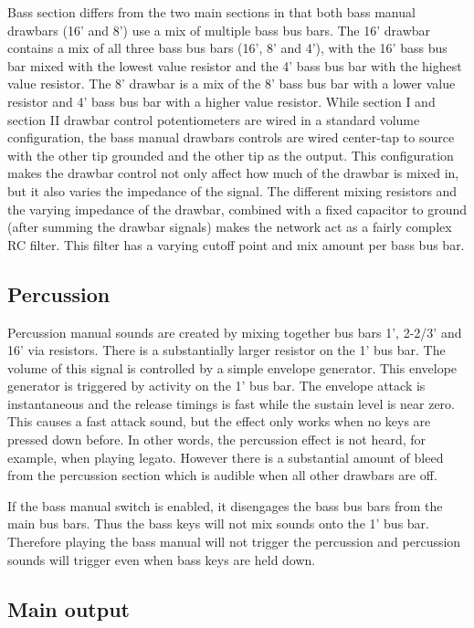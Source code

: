 \documentclass[11pt,a4paper]{article}
\begin{document}
Bass section differs from the two main sections in that both bass manual drawbars (16' and 8') use a mix of multiple bass bus bars. The 16' drawbar contains a mix of all three bass bus bars (16', 8' and 4'), with the 16' bass bus bar mixed with the lowest value resistor and the 4' bass bus bar with the highest value resistor. The 8' drawbar is a mix of the 8' bass bus bar with a lower value resistor and 4' bass bus bar with a higher value resistor. While section I and section II drawbar control potentiometers are wired in a standard volume configuration, the bass manual drawbars controls are wired center-tap to source with the other tip grounded and the other tip as the output. This configuration makes the drawbar control not only affect how much of the drawbar is mixed in, but it also varies the impedance of the signal. The different mixing resistors and the varying impedance of the drawbar, combined with a fixed capacitor to ground (after summing the drawbar signals) makes the network act as a fairly complex RC filter. This filter has a varying cutoff point and mix amount per bass bus bar.

\subsection{Percussion}

Percussion manual sounds are created by mixing together bus bars 1', 2-2/3' and 16' via resistors. There is a substantially larger resistor on the 1' bus bar. The volume of this signal is controlled by a simple envelope generator. This envelope generator is triggered by activity on the 1' bus bar. The envelope attack is instantaneous and the release timings is fast while the sustain level is near zero. This causes a fast attack sound, but the effect only works when no keys are pressed down before. In other words, the percussion effect is not heard, for example, when playing legato. However there is a substantial amount of bleed from the percussion section which is audible when all other drawbars are off.

If the bass manual switch is enabled, it disengages the bass bus bars from the main bus bars. Thus the bass keys will not mix sounds onto the 1' bus bar. Therefore playing the bass manual will not trigger the percussion and percussion sounds will trigger even when bass keys are held down.

\subsection{Main output}
\end{document}
